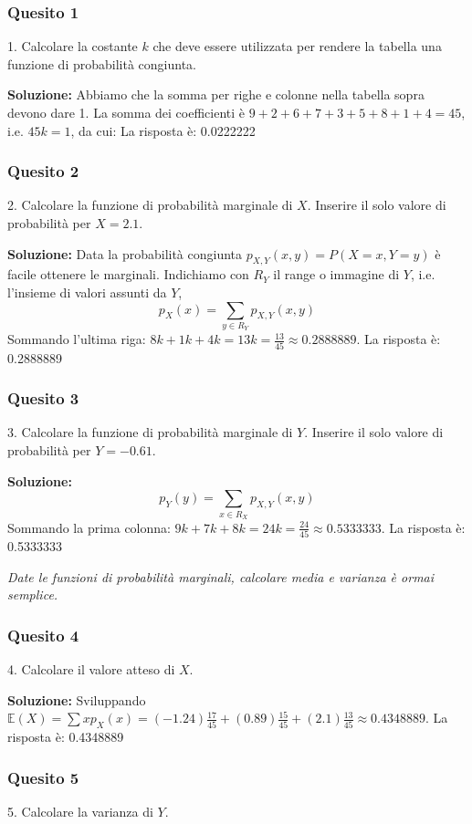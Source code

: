 \documentclass[12pt, a4paper]{article}
\begin{document}
\subsubsection*{Quesito 1}
1. Calcolare la costante $k$ che deve essere utilizzata per rendere la tabella una funzione di probabilità congiunta.

\textbf{Soluzione:}
Abbiamo che la somma per righe e colonne nella tabella sopra devono dare 1. La somma dei coefficienti è $9+2+6+7+3+5+8+1+4 = 45$, i.e. $45k = 1$, da cui:
La risposta è: 0.0222222

\subsubsection*{Quesito 2}
2. Calcolare la funzione di probabilità marginale di $X$. Inserire il solo valore di probabilità per $X=2.1$.

\textbf{Soluzione:}
Data la probabilità congiunta $p_{X,Y}(x,y)=P(X=x,Y=y)$ è facile ottenere le marginali.
Indichiamo con $R_Y$ il range o immagine di $Y$, i.e. l’insieme di valori assunti da $Y$, 
$$ p_X(x) = \sum_{y \in R_Y} p_{X,Y}(x,y) $$
Sommando l'ultima riga: $8k + 1k + 4k = 13k = \frac{13}{45} \approx 0.2888889$.
La risposta è: 0.2888889

\subsubsection*{Quesito 3}
3. Calcolare la funzione di probabilità marginale di $Y$. Inserire il solo valore di probabilità per $Y=-0.61$.

\textbf{Soluzione:}
$$ p_Y(y) = \sum_{x \in R_X} p_{X,Y}(x,y) $$
Sommando la prima colonna: $9k + 7k + 8k = 24k = \frac{24}{45} \approx 0.5333333$.
La risposta è: 0.5333333

\vspace{0.3cm}
\textit{Date le funzioni di probabilità marginali, calcolare media e varianza è ormai semplice.}

\subsubsection*{Quesito 4}
4. Calcolare il valore atteso di $X$.

\textbf{Soluzione:}
Sviluppando $\mathbb{E}(X) = \sum x p_X(x) = (-1.24)\frac{17}{45} + (0.89)\frac{15}{45} + (2.1)\frac{13}{45} \approx 0.4348889$.
La risposta è: 0.4348889

\subsubsection*{Quesito 5}
5. Calcolare la varianza di $Y$.
\end{document}
